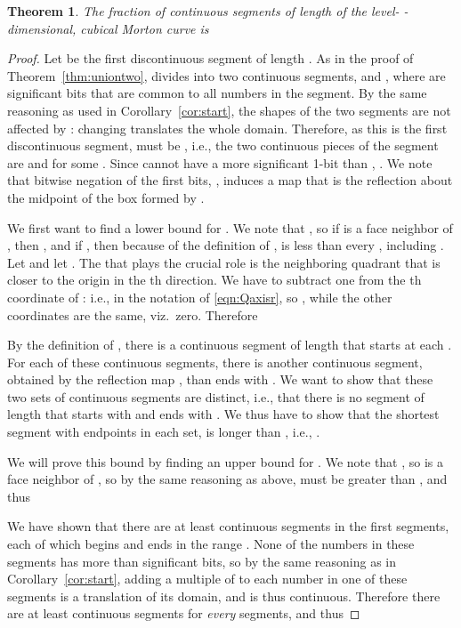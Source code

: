 \documentclass[a4paper,11pt]{article}
\newcommand{\eqnref}[1]{\eqref{eqn:#1}}
\newtheorem{thm}{Theorem}
\begin{document}
\begin{thm}
  \label{thm:lowerbound}
  The fraction of continuous segments of length  of the level-
  -dimensional, cubical Morton curve is

\end{thm}
\begin{proof}
  Let  be
  the first discontinuous segment of length .  As in the proof of
  Theorem~\ref{thm:uniontwo},  divides into two continuous segments,
   and
  , where  are
  significant bits that are common to all numbers in the segment.  By the same
  reasoning as used in Corollary~\ref{cor:start}, the shapes of the two segments
  are not affected by : changing  translates the whole
  domain.  Therefore, as this is the first discontinuous segment, 
  must be , i.e., the two continuous pieces of the segment are
   and 
  for some .  Since  cannot have a more significant 1-bit
  than , .  We note that bitwise negation
  of the first  bits, , induces a map
   that is the reflection about the
  midpoint of the box formed by .

  We first want to find a lower bound for .  We note that
  , so if  is a face neighbor of , then
  , and if , then because of the definition of ,
   is less than every , including . 
  Let  and let .
The  that plays the crucial role is the neighboring quadrant that is
  closer to the origin in
  the th direction.  We have to subtract one from the th
  coordinate of : i.e.,  in the
  notation of \eqnref{Qaxisr}, so
  , while the other coordinates are
  the same, viz.\ zero.  Therefore


  By the definition of , there is a continuous segment of
  length  that starts at each .  For each of these
  continuous segments, there is another continuous segment, obtained by the
  reflection map , than ends with
  .  We want to show that these two
  sets of continuous segments are distinct, i.e., that there is no segment of
  length  that starts with  and ends with .  We thus have to show that the shortest segment with
  endpoints in each set,  is longer than ,
  i.e., .

  We will prove this bound by finding an upper bound for .
  We note that , so  is a face
  neighbor of , so by the same reasoning as above,
   must be greater than , and thus


  We have shown that there are at least  continuous segments in the
  first  segments, each of which begins and ends in the range
  .  None of the numbers in these segments has more than
   significant bits, so by the same reasoning as in
  Corollary~\ref{cor:start}, adding a multiple of  to each number in
  one of these segments is a translation of its domain, and is thus continuous.
  Therefore there are at least  continuous segments for \emph{every}
   segments, and thus
\end{proof}
\end{document}
